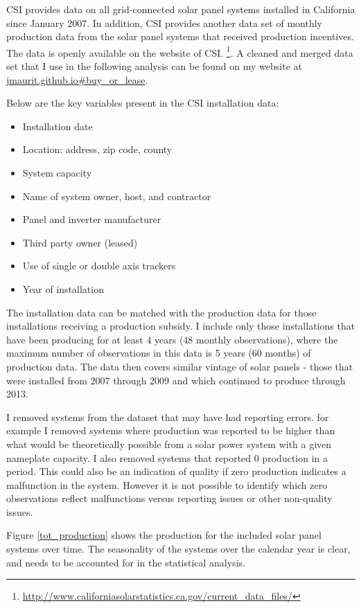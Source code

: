 \documentclass[12pt]{article}
\begin{document}
CSI provides data on all grid-connected solar panel systems installed in California since January 2007. In addition, CSI provides another data set of monthly production data from the solar panel systems that received production incentives. The data is openly available on the website of CSI. \footnote{\url{http://www.californiasolarstatistics.ca.gov/current_data_files/}}. A cleaned and merged data set that I use in the following analysis can be found on my website at \url{jmaurit.github.io#buy_or_lease}.

Below are the key variables present in the CSI installation data:

\begin{itemize}
\item Installation date
\item Location: address, zip code, county
\item System capacity
\item Name of system owner, host, and contractor
\item Panel and inverter manufacturer
\item Third party owner (leased)
\item Use of single or double axis trackers
\item Year of installation
\end{itemize}

The installation data can be matched with the production data for those installations receiving a production subsidy. I include only those installations that have been producing for at least 4 years (48 monthly observations), where the maximum number of observations in this data is 5 years (60 months) of production data. The data then covers similar vintage of solar panels - those that were installed from 2007 through 2009 and which continued to produce through 2013.

I removed systems from the dataset that may have had reporting errors. for example I removed systems where production was reported to be higher than what would be theoretically possible from a solar power system with a given nameplate capacity. I also removed systems that reported 0 production in a period. This could also be an indication of quality if zero production indicates a malfunction in the system. However it is not possible to identify which zero observations reflect malfunctions versus reporting issues or other non-quality issues.

Figure \ref{tot_production} shows the production for the included solar panel systems over time. The seasonality of the systems over the calendar year is clear, and needs to be accounted for in the statistical analysis.
\end{document}
